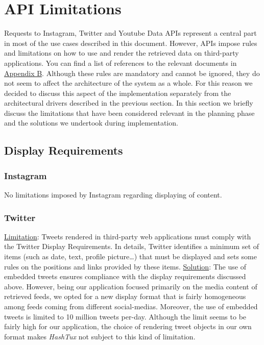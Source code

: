 \hypertarget{apilimits}{
\section{API Limitations}}
Requests to Instagram, Twitter and Youtube Data APIs represent a central part in
most of the use cases described in this document. However, APIs impose rules and
limitations on how to use and render the retrieved data on third-party
applications. You can find a list of references to the relevant documents in
\hyperlink{appb}{Appendix B}. \newline
Although these rules are mandatory and cannot be ignored, they do not seem to
affect the architecture of the system as a whole. For this reason we decided to
discuss this aspect of the implementation separately from the architectural
drivers described in the previous section. In this section we briefly discuss
the limitations that have been considered relevant in the planning phase and the
solutions we undertook during implementation.

\subsection{Display Requirements}
\subsubsection{Instagram}
No limitations imposed by Instagram regarding displaying of content.
\subsubsection{Twitter}
\underline{Limitation}: Tweets rendered in third-party web applications must
comply with the Twitter Display Requirements. In details, Twitter identifies a
minimum set of items (such as date, text, profile picture\dots) that must be
displayed and sets some rules on the positions and links provided by these
items. \newline
\underline{Solution}: The use of embedded tweets ensures compliance with the
display requirements discussed above. However, being our application focused
primarily on the media content of retrieved feeds, we opted for a new display
format that is fairly homogeneous among feeds coming from different
social-medias. Moreover, the use of embedded tweets is limited to 10 million
tweets per-day. Although the limit seems to be fairly high for our application,
the choice of rendering tweet objects in our own format makes \textit{HashTux}
not subject to this kind of limitation.
